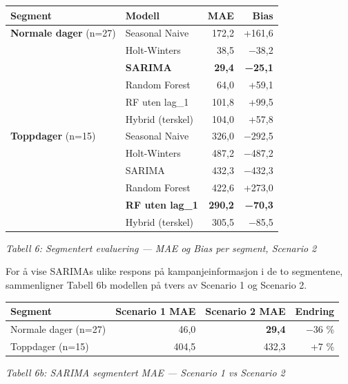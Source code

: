\documentclass[
  norsk,
  11pt,
  a4paper,
]{article}
\newcounter{none} %
\begin{document}
{\def\LTcaptype{none} %
\begin{longtable}[]{@{}llrr@{}}
\toprule\noalign{}
Segment & Modell & MAE & Bias \\
\midrule\noalign{}
\endhead
\bottomrule\noalign{}
\endlastfoot
\textbf{Normale dager} (n=27) & Seasonal Naive & 172,2 & +161,6 \\
& Holt-Winters & 38,5 & −38,2 \\
& \textbf{SARIMA} & \textbf{29,4} & \textbf{−25,1} \\
& Random Forest & 64,0 & +59,1 \\
& RF uten lag\_1 & 101,8 & +99,5 \\
& Hybrid (terskel) & 104,0 & +57,8 \\
\textbf{Toppdager} (n=15) & Seasonal Naive & 326,0 & −292,5 \\
& Holt-Winters & 487,2 & −487,2 \\
& SARIMA & 432,3 & −432,3 \\
& Random Forest & 422,6 & +273,0 \\
& \textbf{RF uten lag\_1} & \textbf{290,2} & \textbf{−70,3} \\
& Hybrid (terskel) & 305,5 & −85,5 \\
\end{longtable}
}

{\centering\small

\emph{Tabell 6: Segmentert evaluering --- MAE og Bias per segment,
Scenario 2}

\par}

For å vise SARIMAs ulike respons på kampanjeinformasjon i de to
segmentene, sammenligner Tabell 6b modellen på tvers av Scenario 1 og
Scenario 2.

{\def\LTcaptype{none} %
\begin{longtable}[]{@{}lrrr@{}}
\toprule\noalign{}
Segment & Scenario 1 MAE & Scenario 2 MAE & Endring \\
\midrule\noalign{}
\endhead
\bottomrule\noalign{}
\endlastfoot
Normale dager (n=27) & 46,0 & \textbf{29,4} & −36 \% \\
Toppdager (n=15) & 404,5 & 432,3 & +7 \% \\
\end{longtable}
}

{\centering\small

\emph{Tabell 6b: SARIMA segmentert MAE --- Scenario 1 vs Scenario 2}

\par}
\end{document}
